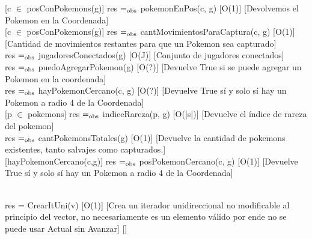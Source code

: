 [c $\in$ posConPokemons(g)]
{res $=_{\mathrm{obs}}$ pokemonEnPos(c, g)}
[O(1)]
[Devolvemos el Pokemon en la Coordenada]
\\

[c $\in$ posConPokemons(g)]
{res $=_{\mathrm{obs}}$ cantMovimientosParaCaptura(c, g)}
[O(1)]
[Cantidad de movimientos restantes para que un Pokemon sea capturado]
\\


{res $=_{\mathrm{obs}}$ jugadoresConectados(g)}
[O(J)]
[Conjunto de jugadores conectados]
\\

{res $=_{\mathrm{obs}}$ puedoAgregarPokemon(g)}
[O(?)]
[Devuelve True si se puede agregar un Pokemon en la coordenada]
\\

{res $=_{\mathrm{obs}}$ hayPokemonCercano(c, g)}
[O(?)]
[Devuelve True s\'i y solo s\'i hay un Pokemon a radio 4 de la Coordenada]
\\

[p $\in$ pokemons]
{res $=_{\mathrm{obs}}$ indiceRareza(p, g)}
[O(|s|)]
[Devuelve el índice de rareza del pokemon]
\\

{res $=_{\mathrm{obs}}$ cantPokemonsTotales(g)}
[O(1)]
[Devuelve la cantidad de pokemons existentes, tanto salvajes como capturados.]
\\

[hayPokemonCercano(c,g)]
{res $=_{\mathrm{obs}}$ posPokemonCercano(c, g)}
[O(1)]
[Devuelve True s\'i y solo s\'i hay un Pokemon a radio 4 de la Coordenada]





\\

{res = CrearItUni(v)}
[O(1)]
[Crea un iterador unidireccional no modificable al principio del vector, no necesariamente es un elemento válido por ende no se puede usar Actual sin Avanzar]
[]\\

